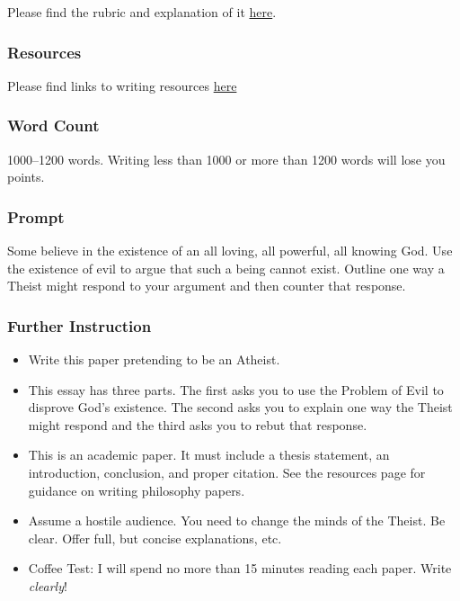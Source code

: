 \documentclass[]{article}
\begin{document}
Please find the rubric and explanation of it
\href{/Teaching/Grading/}{here}.

\subsubsection{Resources}\label{resources}

Please find links to writing resources \href{/Teaching/Resources/}{here}

\subsubsection{Word Count}\label{word-count}

1000--1200 words. Writing less than 1000 or more than 1200 words will
lose you points.

\subsubsection{Prompt}\label{prompt}

Some believe in the existence of an all loving, all powerful, all
knowing God. Use the existence of evil to argue that such a being cannot
exist. Outline one way a Theist might respond to your argument and then
counter that response.

\subsubsection{Further Instruction}\label{further-instruction}

\begin{itemize}
\itemsep1pt\parskip0pt
\item
  Write this paper pretending to be an Atheist.
\item
  This essay has three parts. The first asks you to use the Problem of
  Evil to disprove God's existence. The second asks you to explain one
  way the Theist might respond and the third asks you to rebut that
  response.
\item
  This is an academic paper. It must include a thesis statement, an
  introduction, conclusion, and proper citation. See the resources page
  for guidance on writing philosophy papers.
\item
  Assume a hostile audience. You need to change the minds of the Theist.
  Be clear. Offer full, but concise explanations, etc.
\item
  Coffee Test: I will spend no more than 15 minutes reading each paper.
  Write \emph{clearly}!
\end{itemize}
\end{document}
